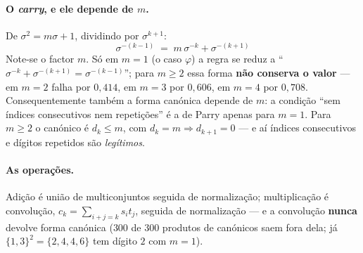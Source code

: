 \documentclass[11pt,a4paper]{article}
\theoremstyle{plain}
\theoremstyle{definition}
\theoremstyle{remark}
\begin{document}
\paragraph{O \emph{carry}, e ele depende de $m$.} De $\sigma^2 = m\sigma+1$, dividindo por
$\sigma^{k+1}$:
\[
  \boxed{\ \sigma^{-(k-1)} \;=\; m\,\sigma^{-k} + \sigma^{-(k+1)}\ }
\]
Note-se o factor $m$. Só em $m=1$ (o caso $\varphi$) a regra se reduz a
``$\sigma^{-k}+\sigma^{-(k+1)} = \sigma^{-(k-1)}$''; para $m\geq2$ essa forma \textbf{não conserva
o valor} --- em $m=2$ falha por $0{,}414$, em $m=3$ por $0{,}606$, em $m=4$ por $0{,}708$.
Consequentemente também a forma canónica depende de $m$: a condição ``sem índices consecutivos nem
repetições'' é a de Parry apenas para $m=1$. Para $m\geq2$ o canónico é $d_k\leq m$, com
$d_k=m \Rightarrow d_{k+1}=0$ --- e aí índices consecutivos e dígitos repetidos são
\emph{legítimos}.

\paragraph{As operações.} Adição é união de multiconjuntos seguida de normalização; multiplicação é
convolução, $c_k = \sum_{i+j=k} s_i t_j$, seguida de normalização --- e a convolução \textbf{nunca}
devolve forma canónica ($300$ de $300$ produtos de canónicos saem fora dela; já
$\{1,3\}^2 = \{2,4,4,6\}$ tem dígito $2$ com $m=1$).
\end{document}
